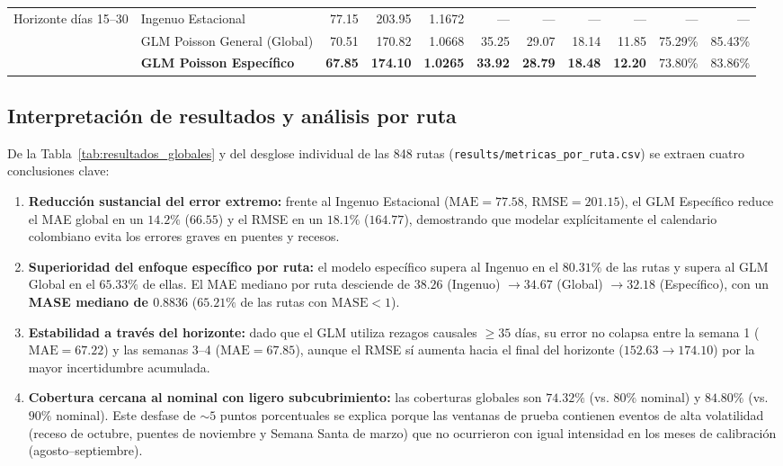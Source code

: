 \documentclass[11pt,a4paper]{article}
\begin{document}
\begin{table}[H]
{\begin{tabular}{llrrrrrrrrr}
\midrule
\multirow{3}{*}{Horizonte días 15--30}
 & Ingenuo Estacional           & 77.15 & 203.95 & 1.1672 & ---   & ---   & ---   & ---   & ---     & ---     \\
 & GLM Poisson General (Global) & 70.51 & 170.82 & 1.0668 & 35.25 & 29.07 & 18.14 & 11.85 & 75.29\% & 85.43\% \\
 & \textbf{GLM Poisson Específico} & \textbf{67.85} & \textbf{174.10} & \textbf{1.0265} & \textbf{33.92} & \textbf{28.79} & \textbf{18.48} & \textbf{12.20} & 73.80\% & 83.86\% \\
\bottomrule
\end{tabular}%
}
\end{table}

\subsection{Interpretación de resultados y análisis por ruta}

De la Tabla~\ref{tab:resultados_globales} y del desglose individual de las 848 rutas (\texttt{results/metricas\_por\_ruta.csv}) se extraen cuatro conclusiones clave:
\begin{enumerate}[leftmargin=1.5em]
    \item \textbf{Reducción sustancial del error extremo:} frente al Ingenuo Estacional ($\text{MAE}=77.58$, $\text{RMSE}=201.15$), el GLM Específico reduce el MAE global en un $14.2\%$ ($66.55$) y el RMSE en un $18.1\%$ ($164.77$), demostrando que modelar explícitamente el calendario colombiano evita los errores graves en puentes y recesos.
    \item \textbf{Superioridad del enfoque específico por ruta:} el modelo específico supera al Ingenuo en el \textbf{$80.31\%$} de las rutas y supera al GLM Global en el \textbf{$65.33\%$} de ellas. El MAE mediano por ruta desciende de $38.26$ (Ingenuo) $\to 34.67$ (Global) $\to \mathbf{32.18}$ (Específico), con un \textbf{MASE mediano de $0.8836$} ($65.21\%$ de las rutas con $\text{MASE} < 1$).
    \item \textbf{Estabilidad a través del horizonte:} dado que el GLM utiliza rezagos causales $\ge 35$ días, su error no colapsa entre la semana 1 ($\text{MAE}=67.22$) y las semanas 3--4 ($\text{MAE}=67.85$), aunque el RMSE sí aumenta hacia el final del horizonte ($152.63 \to 174.10$) por la mayor incertidumbre acumulada.
    \item \textbf{Cobertura cercana al nominal con ligero subcubrimiento:} las coberturas globales son $74.32\%$ (vs. $80\%$ nominal) y $84.80\%$ (vs. $90\%$ nominal). Este desfase de $\sim 5$ puntos porcentuales se explica porque las ventanas de prueba contienen eventos de alta volatilidad (receso de octubre, puentes de noviembre y Semana Santa de marzo) que no ocurrieron con igual intensidad en los meses de calibración (agosto--septiembre).
\end{enumerate}
\end{document}
